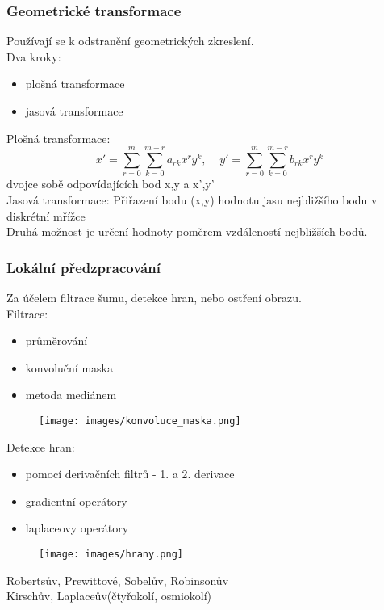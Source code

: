 \subsubsection{Geometrické transformace}
Používají se k odstranění geometrických zkreslení.\\
Dva kroky:
\begin{itemize}
    \item plošná transformace
    \item jasová transformace
\end{itemize}
Plošná transformace:
\begin{equation}
    x' = \sum_{r =0}^m \sum_{k=0}^{m-r}a_{rk}x^ry^k, \;\;\;\; y' = \sum_{r =0}^m \sum_{k=0}^{m-r}b_{rk}x^ry^k
\end{equation}
dvojce sobě odpovídajících bod x,y a x',y'\\
Jasová transformace:
Přiřazení bodu (x,y) hodnotu jasu nejbližšího bodu v diskrétní mřížce\\
Druhá možnost je určení hodnoty poměrem vzdáleností nejbližších bodů.\\
\newpage
\subsubsection{Lokální předzpracování}
Za účelem filtrace šumu, detekce hran, nebo ostření obrazu.\\
Filtrace:
\begin{itemize}
    \item průměrování
    \item konvoluční maska
    \item metoda mediánem
\end{itemize}
\begin{figure}[H]
    \texttt{[image: images/konvoluce\_maska.png]}
\end{figure}

Detekce hran:
\begin{itemize}
    \item pomocí derivačních filtrů - 1. a 2. derivace
    \item gradientní operátory
    \item laplaceovy operátory
\end{itemize}
\begin{figure}[H]
    \texttt{[image: images/hrany.png]}
\end{figure}
Robertsův, Prewittové, Sobelův, Robinsonův\\
Kirschův, Laplaceův(čtyřokolí, osmiokolí)\\

